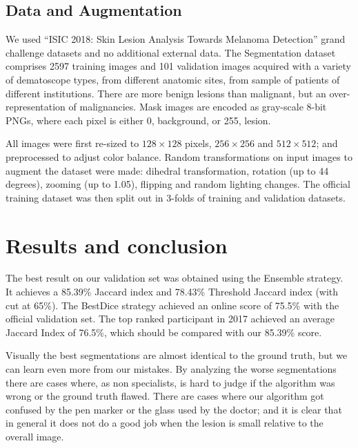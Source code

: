 \documentclass{article}
\begin{document}
\subsection{Data and Augmentation}
We used ``ISIC 2018: Skin Lesion Analysis Towards Melanoma Detection''
grand challenge datasets \cite{codella, ham} and no additional external
data. The Segmentation dataset comprises 2597 training images and 101
validation images acquired with a variety of dematoscope types, from
different anatomic sites, from sample of patients of different
institutions. There are more benign lesions than malignant, but an
over-representation of malignancies. Mask images are encoded as
gray-scale 8-bit PNGs, where each pixel is either 0, background, or 255,
lesion.

All images were first re-sized to $128\times128$ pixels, $256\times256$ and $512\times512$; and preprocessed to adjust color balance.
Random transformations on input images to augment the dataset were made: dihedral transformation, rotation (up to 44 degrees), zooming (up to 1.05), flipping and random lighting changes.
The official training dataset was then split out in 3-folds of training and validation datasets.  


\section{Results and conclusion}

The best result on our validation set was obtained using the Ensemble strategy.  It achieves a 85.39\% Jaccard index and 78.43\% Threshold Jaccard index (with cut at 65\%).
The BestDice strategy achieved an online score of 75.5\% with the official validation set.
The top ranked participant in 2017 achieved an average Jaccard Index of 76.5\%, which should be compared with our 85.39\% score.

Visually the best segmentations are almost identical to the ground truth, but we can learn even more from our mistakes.
By analyzing the worse segmentations there are cases where, as non specialists, is hard to judge if the algorithm was wrong or the ground truth flawed. There are cases where our algorithm got confused by the pen marker or the glass used by the doctor; and it is clear that in general it does not do a good job when the lesion is small relative to the overall image. 
\end{document}
